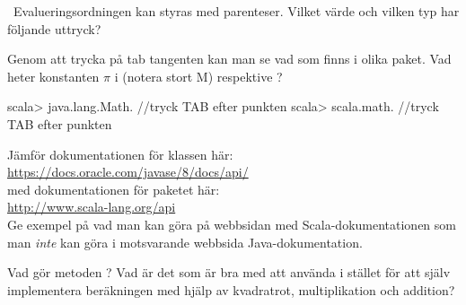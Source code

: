 \QUESTEND






\QUESTBEGIN

\Task \what~Evalueringsordningen kan styras med parenteser. Vilket värde och vilken typ har följande uttryck?

\Subtask {}

\Subtask {}

\Subtask {}

\SOLUTION

\TaskSolved \what

\SubtaskSolved {}

\SubtaskSolved {}

\SubtaskSolved {}

\QUESTEND




\QUESTBEGIN

\Task \what


\Subtask Genom att trycka på tab tangenten kan man se vad som finns i olika paket. Vad heter konstanten $\pi$  i  (notera stort M) respektive ?

\begin{REPL}
scala> java.lang.Math.    //tryck TAB efter punkten
scala> scala.math.        //tryck TAB efter punkten
\end{REPL}

\Subtask Jämför dokumentationen för klassen  här: \\ \url{https://docs.oracle.com/javase/8/docs/api/} \\
med dokumentationen för paketet  här: \\
\url{http://www.scala-lang.org/api} \\
Ge exempel på vad man kan göra på webbsidan med Scala-dokumentationen som man \emph{inte} kan göra i motsvarande webbsida Java-dokumentation.

\Subtask Vad gör metoden ? Vad är det som är bra med att använda  i stället för att själv implementera beräkningen med hjälp av kvadratrot, multiplikation och addition?

\SOLUTION

\TaskSolved \what

